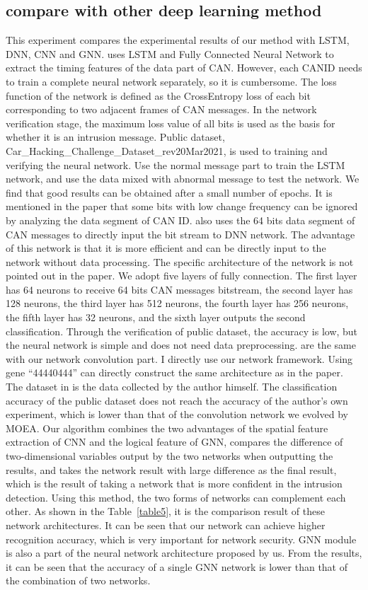 \documentclass[lettersize,journal]{IEEEtran}
\begin{document}
\subsection{compare with other deep learning method}
This experiment compares the experimental results of our method with LSTM, DNN, CNN and GNN. 
\cite{49} uses LSTM and Fully Connected Neural Network to extract the timing features of the data part of CAN. However, each CANID needs to train a complete neural network separately, so it is cumbersome. The loss function of the network is defined as the CrossEntropy loss of each bit corresponding to two adjacent frames of CAN messages. In the network verification stage, the maximum loss value of all bits is used as the basis for whether it is an intrusion message. Public dataset, Car\_Hacking\_Challenge\_Dataset\_rev20Mar2021\cite{74}, is used to training and verifying the neural network. Use the normal message part to train the LSTM network, and use the data mixed with abnormal message to test the network. We find that good results can be obtained after a small number of epochs. It is mentioned in the paper that some bits with low change frequency can be ignored by analyzing the data segment of CAN ID.
\cite{75} also uses the 64 bits data segment of CAN messages to directly input the bit stream to DNN network. The advantage of this network is that it is more efficient and can be directly input to the network without data processing. The specific architecture of the network is not pointed out in the paper. We adopt five layers of fully connection. The first layer has 64 neurons to receive 64 bits CAN messages bitstream, the second layer has 128 neurons, the third layer has 512 neurons, the fourth layer has 256 neurons, the fifth layer has 32 neurons, and the sixth layer outputs the second classification. Through the verification of public dataset, the accuracy is low, but the neural network is simple and does not need data preprocessing.
\cite{48} are the same with our network convolution part. I directly use our network framework. Using gene “44440444” can directly construct the same architecture as in the paper.  The dataset in \cite{48} is the data collected by the author himself. The classification accuracy of the public dataset does not reach the accuracy of the author's own experiment, which is lower than that of the convolution network we evolved by MOEA. Our algorithm combines the two advantages of the spatial feature extraction of CNN and the logical feature of GNN, compares the difference of two-dimensional variables output by the two networks when outputting the results, and takes the network result with large difference as the final result, which is the result of taking a network that is more confident in the intrusion detection. Using this method, the two forms of networks can complement each other. As shown in the Table~\ref{table5}, it is the comparison result of these network architectures. It can be seen that our network can achieve higher recognition accuracy, which is very important for network security. GNN module is also a part of the neural network architecture proposed by us. From the results, it can be seen that the accuracy of a single GNN network is lower than that of the combination of two networks.
\end{document}

